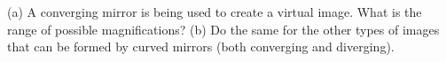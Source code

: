 (a) A converging mirror is being used to create a virtual
image. What is the range of possible magnifications? (b) Do
the same for the other types of images that can be formed by
curved mirrors (both converging and diverging).
